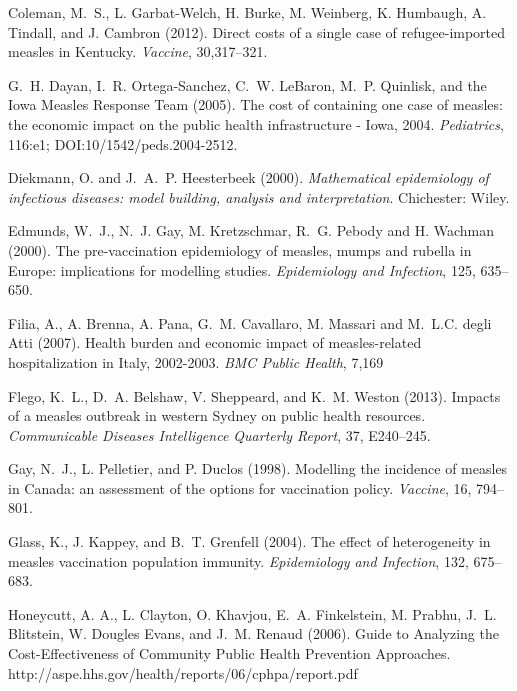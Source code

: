 \documentclass{article}
\begin{document}
\begin{thebibliography}{}
Coleman, M.~S., L. Garbat-Welch, H. Burke, M. Weinberg, K. Humbaugh, A. Tindall, and J. Cambron (2012).
\newblock Direct costs of a single case of refugee-imported measles in Kentucky.
\newblock \emph{Vaccine}, 30,317--321.

G.~H. Dayan, I.~R. Ortega-Sanchez, C.~W. LeBaron, M.~P. Quinlisk, and the Iowa Measles Response Team (2005).
\newblock The cost of containing one case of measles: the economic impact on the public health infrastructure - Iowa, 2004.
\newblock \emph{Pediatrics}, 116:e1; DOI:10/1542/peds.2004-2512.

Diekmann, O. and  J.~A.~P. Heesterbeek (2000).
\newblock \emph{Mathematical epidemiology of infectious diseases: model building, analysis and interpretation}.
Chichester: Wiley.

Edmunds, W.~J., N.~J. Gay, M. Kretzschmar, R.~G. Pebody and H. Wachman (2000).
\newblock The pre-vaccination epidemiology of measles, mumps and rubella in Europe: implications for modelling studies.
\newblock \emph{Epidemiology and Infection}, 125, 635--650.

Filia, A., A. Brenna, A. Pana, G.~M. Cavallaro, M. Massari and M.~L.C. degli Atti (2007).
\newblock Health burden and economic impact of measles-related hospitalization in Italy, 2002-2003.
\newblock \emph{BMC Public Health}, 7,169

Flego, K.~L., D.~A. Belshaw, V. Sheppeard, and K.~M. Weston (2013).
\newblock Impacts of a measles outbreak in western Sydney on public health resources.
\newblock \emph{Communicable Diseases Intelligence Quarterly Report}, 37, E240--245.

Gay, N.~J., L. Pelletier, and P. Duclos (1998).
\newblock Modelling the incidence of measles in Canada: an assessment of the options for vaccination policy.
\newblock \emph{Vaccine}, 16, 794--801.

Glass, K., J. Kappey, and B.~T. Grenfell (2004).
\newblock The effect of heterogeneity in measles vaccination population immunity.
\newblock \emph{Epidemiology and Infection}, 132, 675--683.

Honeycutt, A. A., L. Clayton, O. Khavjou, E.~A. Finkelstein, M. Prabhu, J.~L. Blitstein, W. Dougles Evans, and J.~M. Renaud (2006).
\newblock Guide to Analyzing the Cost-Effectiveness of Community Public Health Prevention Approaches.
http://aspe.hhs.gov/health/reports/06/cphpa/report.pdf


\end{thebibliography}
\end{document}

